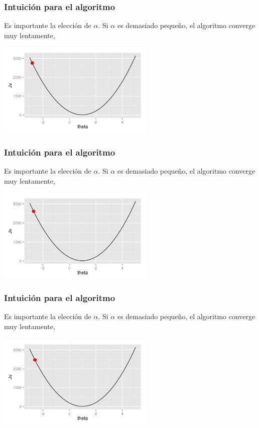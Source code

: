 \documentclass[aspectratio=169]{beamer}
\begin{document}
\begin{frame}
 \frametitle{Intuición para el algoritmo}
 \begin{overlayarea}{\textwidth}{8cm}
Es importante la elección de $\alpha$. Si $\alpha$ es demasiado pequeño, el algoritmo converge muy lentamente,
\begin{center}
  \includegraphics[height=4.5cm]{gradientdescent-smallalpha-3.png}
\end{center}
 \end{overlayarea}
\end{frame}

\begin{frame}
 \frametitle{Intuición para el algoritmo}
 \begin{overlayarea}{\textwidth}{8cm}
Es importante la elección de $\alpha$. Si $\alpha$ es demasiado pequeño, el algoritmo converge muy lentamente,
\begin{center}
  \includegraphics[height=4.5cm]{gradientdescent-smallalpha-4.png}
\end{center}
 \end{overlayarea}
\end{frame}

\begin{frame}
 \frametitle{Intuición para el algoritmo}
 \begin{overlayarea}{\textwidth}{8cm}
Es importante la elección de $\alpha$. Si $\alpha$ es demasiado pequeño, el algoritmo converge muy lentamente,
\begin{center}
  \includegraphics[height=4.5cm]{gradientdescent-smallalpha-5.png}
\end{center}
 \end{overlayarea}
\end{frame}
\end{document}
